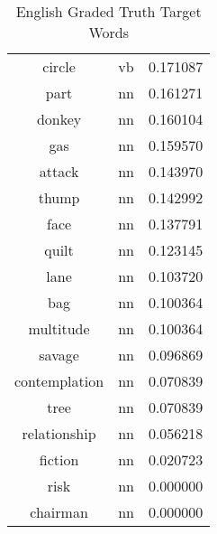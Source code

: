 \begin{table}[h]
\begin{tabular}{ccc}
circle        & vb  & 0.171087         \\
part          & nn  & 0.161271         \\
donkey        & nn  & 0.160104         \\
gas           & nn  & 0.159570         \\
attack        & nn  & 0.143970         \\
thump         & nn  & 0.142992         \\
face          & nn  & 0.137791         \\
quilt         & nn  & 0.123145         \\
lane          & nn  & 0.103720         \\
bag           & nn  & 0.100364         \\
multitude     & nn  & 0.100364         \\
savage        & nn  & 0.096869         \\
contemplation & nn  & 0.070839         \\
tree          & nn  & 0.070839         \\
relationship  & nn  & 0.056218         \\
fiction       & nn  & 0.020723         \\
risk          & nn  & 0.000000         \\
chairman      & nn  & 0.000000         \\
\bottomrule
\end{tabular}
\caption{English Graded Truth Target Words}
\label{tab:eng-truthtargets}
\end{table}


